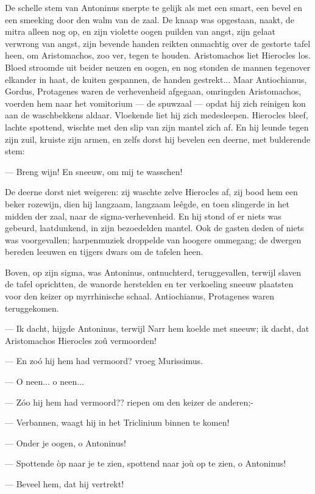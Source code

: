 \documentclass[a4paper, 12pt, oneside, dutch]{article}
\begin{document}
De schelle stem van Antoninus snerpte te gelijk als met een smart, een bevel en een smeeking door den walm van de zaal. De knaap was opgestaan, naakt, de mitra alleen nog op, en zijn violette oogen puilden van angst, zijn gelaat verwrong van angst, zijn bevende handen reikten onmachtig over de gestorte tafel heen, om Aristomachos, zoo ver, tegen te houden. Aristomachos liet Hierocles los. Bloed stroomde uit beider neuzen en oogen, en nog stonden de mannen tegenover elkander in haat, de kuiten gespannen, de handen gestrekt... Maar Antiochianus, Gordus, Protagenes waren de verhevenheid afgegaan, omringden Aristomachos, voerden hem naar het vomitorium --- de spuwzaal --- opdat hij zich reinigen kon aan de waschbekkens aldaar. Vloekende liet hij zich medesleepen. Hierocles bleef, lachte spottend, wischte met den slip van zijn mantel zich af. En hij leunde tegen zijn zuil, kruiste zijn armen, en zelfs dorst hij bevelen een deerne, met bulderende stem:

--- Breng wijn! En sneeuw, om mij te wasschen!

De deerne dorst niet weigeren: zij waschte zelve Hierocles af, zij bood hem een beker rozewijn, dien hij langzaam, langzaam leêgde, en toen slingerde in het midden der zaal, naar de sigma-verhevenheid. En hij stond of er niets was gebeurd, laatdunkend, in zijn bezoedelden mantel. Ook de gasten deden of niets was voorgevallen; harpenmuziek droppelde van hoogere ommegang; de dwergen bereden leeuwen en tijgers dwars om de tafelen heen.

Boven, op zijn sigma, was Antoninus, ontnuchterd, teruggevallen, terwijl slaven de tafel oprichtten, de wanorde herstelden en ter verkoeling sneeuw plaatsten voor den keizer op myrrhinische schaal. Antiochianus, Protagenes waren teruggekomen.

--- Ik dacht, hijgde Antoninus, terwijl Narr hem koelde met sneeuw; ik dacht, dat Aristomachos Hierocles zoû vermoorden!

--- En zoó hij hem had vermoord? vroeg Murissimus.

--- O neen... o neen...

--- Zóo hij hem had vermoord?? riepen om den keizer de anderen;-

--- Verbannen, waagt hij in het Triclinium binnen te komen!

--- Onder je oogen, o Antoninus!

--- Spottende òp naar je te zien, spottend naar joù op te zien, o Antoninus!

--- Beveel hem, dat hij vertrekt!
\end{document}

